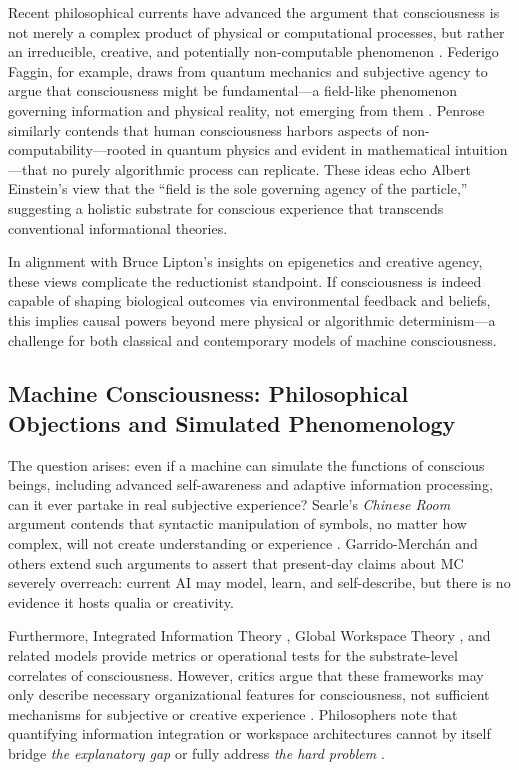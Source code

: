 Recent philosophical currents have advanced the argument that consciousness is not merely a complex product of physical or computational processes, but rather an irreducible, creative, and potentially non-computable phenomenon \cite{faggin2024irreducible,lipton2016biology,penrose1990emperors}. Federigo Faggin, for example, draws from quantum mechanics and subjective agency to argue that consciousness might be fundamental---a field-like phenomenon governing information and physical reality, not emerging from them \cite{faggin2024irreducible}. Penrose \citeyear{penrose1990emperors} similarly contends that human consciousness harbors aspects of non-computability---rooted in quantum physics and evident in mathematical intuition---that no purely algorithmic process can replicate. These ideas echo Albert Einstein's view that the ``field is the sole governing agency of the particle,'' suggesting a holistic substrate for conscious experience that transcends conventional informational theories.

In alignment with Bruce Lipton's \citeyear{lipton2016biology} insights on epigenetics and creative agency, these views complicate the reductionist standpoint. If consciousness is indeed capable of shaping biological outcomes via environmental feedback and beliefs, this implies causal powers beyond mere physical or algorithmic determinism---a challenge for both classical and contemporary models of machine consciousness.

\subsection{Machine Consciousness: Philosophical Objections and Simulated Phenomenology}

The question arises: even if a machine can simulate the functions of conscious beings, including advanced self-awareness and adaptive information processing, can it ever partake in real subjective experience? Searle's \emph{Chinese Room} argument contends that syntactic manipulation of symbols, no matter how complex, will not create understanding or experience \cite{searle1980minds}. Garrido-Merchán \citeyear{garridomerchan2024machine} and others extend such arguments to assert that present-day claims about MC severely overreach: current AI may model, learn, and self-describe, but there is no evidence it hosts qualia or creativity.

Furthermore, Integrated Information Theory \cite{tononi2016integrated}, Global Workspace Theory \cite{baars2001conscious}, and related models provide metrics or operational tests for the substrate-level correlates of consciousness. However, critics argue that these frameworks may only describe necessary organizational features for consciousness, not sufficient mechanisms for subjective or creative experience \cite{francken2022consciousness}. Philosophers note that quantifying information integration or workspace architectures cannot by itself bridge \emph{the explanatory gap} or fully address \emph{the hard problem} \cite{levine1983materialism}.

